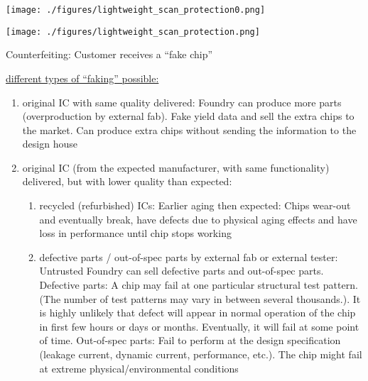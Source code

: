\documentclass[landscape, a4paper]{article}
\begin{document}
\begin{minipage}[t]{0.2\linewidth}
\begin{betterlist}
\begin{enumerate}
\begin{enumerate}
				\texttt{[image: ./figures/lightweight\_scan\_protection0.png]}

				\texttt{[image: ./figures/lightweight\_scan\_protection.png]}
			\end{enumerate}
		\end{enumerate}
	\end{betterlist}
	\begin{betterlist}
		\item \alert{Counterfeiting:} Customer receives a \enquote{fake chip}
		\item \underline{different types of \enquote{faking} possible:}
		\begin{enumerate}
			\item \alert{original IC with same quality delivered:} Foundry can produce more parts (overproduction by external fab). Fake yield data and sell the extra chips to the market. Can produce extra chips without sending the information to the design house
			\item \alert{original IC (from the expected manufacturer, with same functionality) delivered, but with lower quality than expected:}
			\begin{enumerate}[label=\color{PrimaryColor}\bfseries\alph*.]
				\item \alert{recycled (refurbished) ICs:} Earlier aging then expected: Chips wear-out and eventually break, have defects due to physical aging effects and have loss in performance until chip stops working
				\item \alert{defective parts / out-of-spec parts by external fab or external tester:} Untrusted Foundry can sell defective parts and out-of-spec parts. \alert{Defective parts:} A chip may fail at one particular structural test pattern. (The number of test patterns may vary in between several thousands.). It is highly unlikely that defect will appear in normal operation of the chip in first few hours or days or months. Eventually, it will fail at some point of time. \alert{Out-of-spec parts:} Fail to perform at the design specification (leakage current, dynamic current, performance, etc.). The chip might fail at extreme physical/environmental conditions

\end{enumerate}
\end{enumerate}
\end{betterlist}
\end{minipage}
\end{document}
